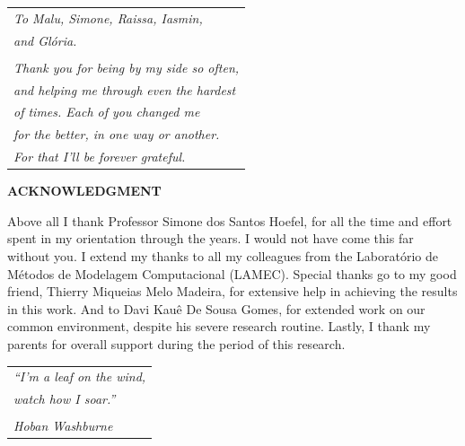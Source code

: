 \begin{flushright}\vspace*{\fill}
    \begin{small}
        \begin{tabular}{l}
            \textit{To Malu, Simone, Raissa, Iasmin,}\\
            \textit{and Glória.}\\
            \\
            \textit{Thank you for being by my side so often,}\\
            \textit{and helping me through even the hardest}\\
            \textit{of times. Each of you changed me}\\
            \textit{for the better, in one way or another.}\\
            \textit{For that I'll be forever grateful.}\\
        \end{tabular}
    \end{small}
\end{flushright}
\newpage\begin{center}\textbf{ACKNOWLEDGMENT}\end{center}\vspace{1cm}

Above all I thank Professor Simone dos Santos Hoefel, for all the time and effort spent in my orientation through the years. I would not have come this far without you. I extend my thanks to all my colleagues from the Laboratório de Métodos de Modelagem Computacional (LAMEC). Special thanks go to my good friend, Thierry Miqueias Melo Madeira, for extensive help in achieving the results in this work. And to Davi Kauê De Sousa Gomes, for extended work on our common \LaTeXe\hspace{1pt} environment, despite his severe research routine. Lastly, I thank my parents for overall support during the period of this research.

\newpage\begin{epigrafe}\vspace*{\fill}
    \begin{flushright}
        \begin{small}
            \begin{tabular}{l}
                \textit{``I'm a leaf on the wind,}\\
                \textit{watch how I soar.''}\\
                \\
                \textit{Hoban Washburne}
            \end{tabular}
        \end{small}
    \end{flushright}
\end{epigrafe}
